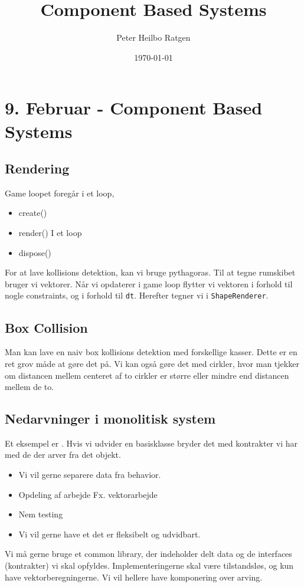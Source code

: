 \documentclass{article}
\title{Component Based Systems}
\author{Peter Heilbo Ratgen}
\date{\today}
\begin{document}
\maketitle

\section{9. Februar - Component Based Systems}

\subsection{Rendering}
Game loopet foregår i et loop, 
\begin{itemize}
  \item create()
  \item render()
    \subitem I et loop
  \item dispose()
\end{itemize}

For at lave kollisions detektion, kan vi bruge pythagoras. Til at tegne
rumskibet bruger vi vektorer. Når vi opdaterer i game loop flytter vi vektoren
i forhold til nogle constraints, og i forhold til \texttt{dt}. Herefter tegner
vi i \texttt{ShapeRenderer}.

\subsection{Box Collision}
Man kan lave en naiv box kollisions detektion med forskellige kasser. Dette er
en ret grov måde at gøre det på. Vi kan også gøre det med cirkler, hvor man
tjekker om distancen mellem centeret af to cirkler er større eller mindre end
distancen mellem de to.

\subsection{Nedarvninger i monolitisk system}
Et eksempel er . Hvis vi udvider en basisklasse
bryder det med kontrakter vi har med de der arver fra det objekt.

\begin{itemize}
  \item Vi vil gerne separere data fra behavior.
  \item Opdeling af arbejde
    \subitem Fx. vektorarbejde
  \item Nem testing
  \item Vi vil gerne have et det er fleksibelt og udvidbart. 
\end{itemize}
Vi må gerne bruge et common library, der indeholder delt data og de interfaces
(kontrakter) vi skal opfyldes.
Implementeringerne skal være tilstandsløs, og kun have vektorberegningerne. Vi
vil hellere have komponering over arving.
\end{document}
